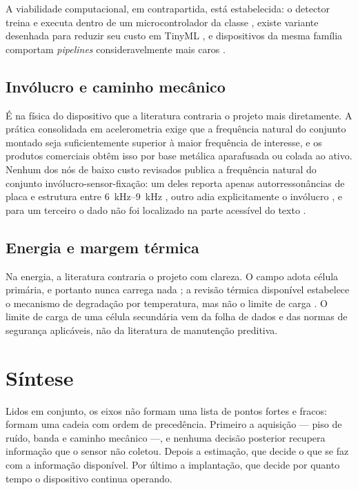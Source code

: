 A viabilidade computacional, em contrapartida, está estabelecida: o detector treina e
executa dentro de um microcontrolador da classe \cite{antonini2023}, existe variante
desenhada para reduzir seu custo em TinyML \cite{barbariol2022}, e dispositivos da mesma
família comportam \emph{pipelines} consideravelmente mais caros \cite{uselis2025,kumar2026}.

\subsection{Invólucro e caminho mecânico}

É na física do dispositivo que a literatura contraria o projeto mais diretamente. A prática
consolidada em acelerometria exige que a frequência natural do conjunto montado seja
suficientemente superior à maior frequência de interesse, e os produtos comerciais obtêm
isso por base metálica aparafusada ou colada ao ativo. Nenhum dos nós de baixo custo
revisados publica a frequência natural do conjunto invólucro-sensor-fixação: um deles
reporta apenas autorressonâncias de placa e estrutura entre \SIrange{6}{9}{\kilo\hertz}
\cite{jakobsen2024}, outro adia explicitamente o invólucro \cite{antonini2023}, e para um
terceiro o dado não foi localizado na parte acessível do texto \cite{bisio2025}.

\subsection{Energia e margem térmica}

Na energia, a literatura contraria o projeto com clareza. O campo adota célula primária, e
portanto nunca carrega nada \cite{nabavi2025}; a revisão térmica disponível estabelece o
mecanismo de degradação por temperatura, mas não o limite de carga \cite{ma2018}. O limite
de carga de uma célula secundária vem da folha de dados e das normas de segurança
aplicáveis, não da literatura de manutenção preditiva. 

\section{Síntese}
\label{sec:rev-sintese}

Lidos em conjunto, os eixos não formam uma lista de pontos fortes e fracos: formam uma
cadeia com ordem de precedência. Primeiro a aquisição --- piso de ruído, banda e caminho
mecânico ---, e nenhuma decisão posterior recupera informação que o sensor não coletou.
Depois a estimação, que decide o que se faz com a informação disponível. Por último a
implantação, que decide por quanto tempo o dispositivo continua operando.

